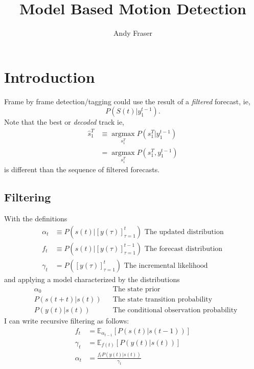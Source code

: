 \documentclass[12pt]{article}
\title{Model Based Motion Detection}
\author{Andy Fraser}
\newcommand{\field}[1]{\mathbb{#1}}
\newcommand{\EV}[2]{\field{E}_{#1}\left[#2\right]}
\newcommand{\os}[4]{{\left[ #1(#2) \right]}_{#3}^{#4}} %
\newcommand{\ti}[2]{{#1}{(#2)}}                         %
\newcommand{\ts}[4]{\os{#1}{#2}{#2=#3}{#4}} %
\newcommand{\argmax}{\operatorname*{argmax}}
\begin{document}
\maketitle

\section{Introduction}
\label{sec:introduction}

Frame by frame detection/tagging could use the result of a \emph{filtered}
forecast, ie,
\begin{equation*}
  P(S(t)|y_1^{t-1}).
\end{equation*}
Note that the best or \emph{decoded} track ie,
\begin{align*}
  \hat s_1^T &\equiv \argmax_{s_1^T} P(s_1^T|y_1^{t-1}) \\
            &=  \argmax_{s_1^T} P(s_1^T,y_1^{t-1})
\end{align*}
is different than the sequence of filtered forecasts.

\subsection{Filtering}
\label{sec:filtering}

With the definitions
\begin{align}
  \label{def:alpha}
  \alpha_t &\equiv P(\ti{s}{t}|\ts{y}{\tau}{1}{t}) \text{ The updated distribution} \\
  f_t &\equiv P(\ti{s}{t}|\ts{y}{\tau}{1}{t-1}) \text{ The forecast
    distribution} \\
  \gamma_t &= P(\ts{y}{\tau}{1}{t}) \text{ The incremental likelihood}
\end{align}
and applying a model characterized by the distributions
\begin{align}
  \label{def:alpha0}
  &\alpha_0  &&\text{The state prior} \\
  &P(\ti{s}{t+t}|\ti{s}{t}) &&\text{The state transition probability} \\
  &P(\ti{y}{t}|\ti{s}{t}) &&\text{The conditional observation probability}
\end{align}
I can write recursive filtering as follows:
\begin{align}
  f_t &= \EV{\alpha_{t-1}} {P(\ti{s}{t}|\ti{s}{t-1})} \\
  \gamma_t &= \EV{\ti{f}{t}} {P(\ti{y}{t}|\ti{s}{t})} \\
  \alpha_t &= \frac{f_t P(\ti{y}{t}|\ti{s}{t})}{\gamma_t} \\
\end{align}
\end{document}
